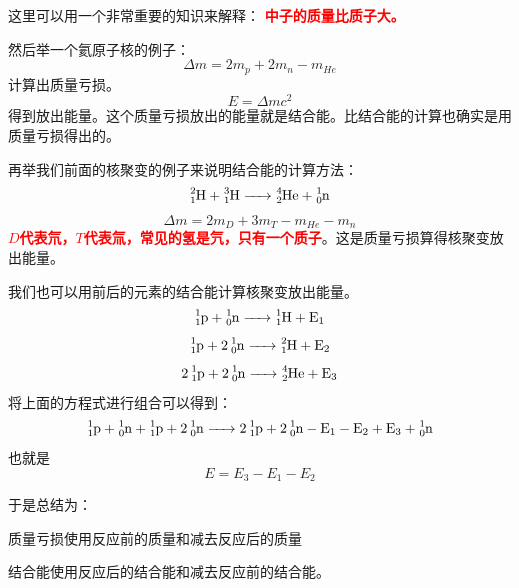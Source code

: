 \documentclass[12pt,a4paper]{article}
\begin{document}
这里可以用一个非常重要的知识来解释：
\textbf{\textcolor{red}{中子的质量比质子大。}}

然后举一个氦原子核的例子：
\begin{equation*}
    \Delta m = 2m_p + 2m_n - m_{He}
\end{equation*}
计算出质量亏损。
\begin{equation*}
    E = \Delta mc^2
\end{equation*}
得到放出能量。这个质量亏损放出的能量就是结合能。比结合能的计算也确实是用质量亏损得出的。

再举我们前面的核聚变的例子来说明结合能的计算方法：
\begin{equation*}
    \ce{^{2}_{1}H + ^{3}_{1}H -> ^{4}_{2}He + ^{1}_{0}n}
\end{equation*}
\begin{equation*}
    \Delta m = 2m_{D} + 3m_{T} - m_{He} - m_n
\end{equation*}
\textbf{\textcolor{red}{$D$代表氘，$T$代表氚，常见的氢是氕，只有一个质子}}。这是质量亏损算得核聚变放出能量。

我们也可以用前后的元素的结合能计算核聚变放出能量。
\begin{equation*}
    \ce{^1_1p + ^1_0n -> ^1_1H + E_1}
\end{equation*}
\begin{equation*}
    \ce{^1_1p + 2^1_0n -> ^2_1H + E_2}
\end{equation*}
\begin{equation*}
    \ce{2^1_1p + 2^1_0n -> ^4_2He + E_3}
\end{equation*}
将上面的方程式进行组合可以得到：
\begin{equation*}
    \ce{^1_1p + ^1_0n + ^1_1p + 2^1_0n -> 2^1_1p + 2^1_0n - E_1 - E_2 + E_3 + ^1_0n}
\end{equation*}
也就是
\begin{equation*}
    E=E_3-E_1-E_2
\end{equation*}

于是总结为：
\begin{tcolorbox}[colback=yellow!20, colframe=red!75!black, title=考试重点]
质量亏损使用反应前的质量和减去反应后的质量

结合能使用反应后的结合能和减去反应前的结合能。
\end{tcolorbox}
\end{document}

